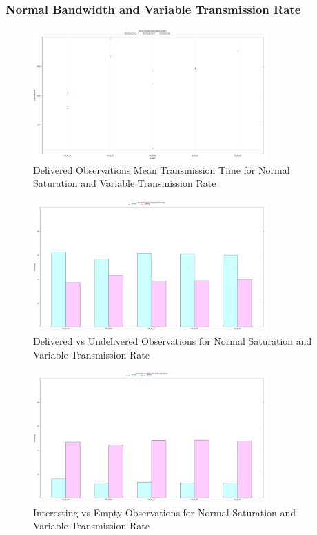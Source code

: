 \subsubsection{Normal Bandwidth and Variable Transmission Rate}
	\begin{figure}[H]
	\centering
	\includegraphics[width=0.8\textwidth]{Chap7/figures/plots/normal_variable/delivered_mean.png}
	\caption{Delivered Observations Mean Transmission Time for Normal Saturation and Variable Transmission Rate}
	\label{fig:sim:res:norm:variable:delmean}
	\end{figure}

	\begin{figure}[H]
	\centering
	\includegraphics[width=0.8\textwidth]{Chap7/figures/plots/normal_variable/delvsundel_percent.png}
	\caption{Delivered vs Undelivered Observations for Normal Saturation and Variable Transmission Rate}
	\label{fig:sim:res:norm:variable:delundel}
	\end{figure}

	\begin{figure}[H]
	\centering
	\includegraphics[width=0.8\textwidth]{Chap7/figures/plots/normal_variable/emptvsint_percent.png}
	\caption{Interesting vs Empty Observations for Normal Saturation and Variable Transmission Rate}
	\label{fig:sim:res:norm:variable:emptint}
	\end{figure}

